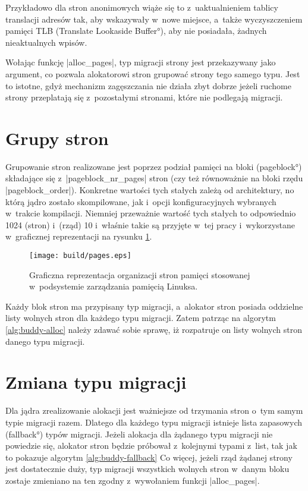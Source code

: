 Przykładowo dla stron anonimowych wiąże się to z~uaktualnieniem
tablicy translacji adresów tak, aby wskazywały w~nowe miejsce, a~także
wyczyszczeniem pamięci TLB (\ang{Translate Lookaside Buffer}), aby nie
posiadała, żadnych nieaktualnych wpisów.

Wołając funkcję \code|alloc_pages|, typ migracji strony jest
przekazywany jako argument, co pozwala alokatorowi stron grupować
strony tego samego typu.  Jest to istotne, gdyż mechanizm zagęszczania
nie działa zbyt dobrze jeżeli ruchome strony przeplatają się
z~pozostałymi stronami, które nie podlegają migracji.


\section{Grupy stron}

Grupowanie stron realizowane jest poprzez podział pamięci na bloki
(\ang{pageblock}) składające się z~\code|pageblock_nr_pages| stron
(czy też równoważnie na bloki rzędu \code|pageblock_order|).
Konkretne wartości tych stałych zależą od architektury, no którą jądro
zostało skompilowane, jak i~opcji konfiguracyjnych wybranych w~trakcie
kompilacji.  Niemniej przeważnie wartość tych stałych to odpowiednio
1024 (stron) i~(rząd) 10 i~właśnie takie są przyjęte w~tej pracy
i~wykorzystane w~graficznej reprezentacji na rysunku \ref{fig:pages}.

\begin{figure}[tbp]
\begin{center}
\texttt{[image: build/pages.eps]}
\end{center}
\caption[Organizacja pamięci w~Linuksie.]{Graficzna reprezentacja
  organizacji stron pamięci stosowanej w~podsystemie zarządzania
  pamięcią Linuksa.}
\label{fig:pages}
\end{figure}

Każdy blok stron ma przypisany typ migracji, a~alokator stron posiada
oddzielne listy wolnych stron dla każdego typu migracji.  Zatem
patrząc na algorytm \ref{alg:buddy-alloc} należy zdawać sobie sprawę,
iż rozpatruje on listy wolnych stron danego typu migracji.

\section{Zmiana typu migracji}\label{sec:type-change}

Dla jądra zrealizowanie alokacji jest ważniejsze od trzymania stron
o~tym samym typie migracji razem.  Dlatego dla każdego typu migracji
istnieje lista zapasowych (\ang{fallback}) typów migracji.  Jeżeli
alokacja dla żądanego typu migracji nie powiedzie się, alokator stron
będzie próbował z~kolejnymi typami z~list, tak jak to pokazuje
algorytm \ref{alg:buddy-fallback} Co więcej, jeżeli rząd żądanej
strony jest dostatecznie duży, typ migracji wszystkich wolnych stron
w~danym bloku zostaje zmieniano na ten zgodny z~wywołaniem funkcji
\code|alloc_pages|.

